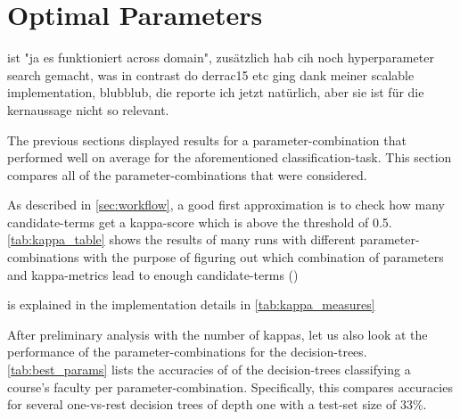 \section{Optimal Parameters}
\label{sec:results_params}

 ist "ja es funktioniert across domain", zusätzlich hab cih noch hyperparameter search gemacht, was in contrast do derrac15 etc ging dank meiner scalable implementation, blubblub, die reporte ich jetzt natürlich, aber sie ist für die kernaussage nicht so relevant.

The previous sections displayed results for a parameter-combination that performed well on average for the aforementioned classification-task. This section compares all of the parameter-combinations that were considered. 

As described in \autoref{sec:workflow}, a good first approximation is to check how many candidate-terms get a kappa-score which is above the threshold of 0.5. \autoref{tab:kappa_table} shows the results of many runs with different parameter-combinations with the purpose of figuring out which combination of parameters and kappa-metrics lead to enough candidate-terms ()



 is explained in the implementation details in  \autoref{tab:kappa_measures}

After preliminary analysis with the number of kappas, let us also look at the performance of the parameter-combinations for the decision-trees. \autoref{tab:best_params} lists the accuracies of of the decision-trees classifying a course's faculty per parameter-combination. Specifically, this compares accuracies for several one-vs-rest decision trees of depth one with a test-set size of 33\%.


\newcommand{\SmfauhcsdT}{\setlength\extrarowheight{-5pt} \scriptsize \mfauhcsdT}
\newcommand{\Smfauhtcsldp}{\setlength\extrarowheight{-5pt} \scriptsize \mfauhtcsldp}

